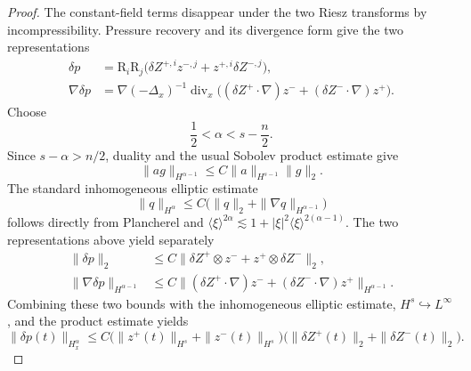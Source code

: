 \documentclass[11pt,reqno]{amsart}
\theoremstyle{plain}
\theoremstyle{definition}
\theoremstyle{remark}
\numberwithin{equation}{section}
\DeclareMathOperator{\Div}{div}
\newcommand{\Riesz}{\mathrm R}
\begin{document}
\begin{proof}
The constant-field terms disappear under the two Riesz transforms by
incompressibility.  Pressure recovery and its divergence form give the two
representations
\[
\begin{aligned}
 \delta p
 &=\Riesz_i\Riesz_j\bigl(
   \delta Z^{+,i}z^{-,j}+z^{+,i}\delta Z^{-,j}\bigr),\\
 \nabla\delta p
 &=\nabla(-\Delta_x)^{-1}\Div_x\bigl(
   (\delta Z^+\cdot\nabla)z^-
   +(\delta Z^-\cdot\nabla)z^+\bigr).
\end{aligned}
\]
Choose
\[
 \frac12<\alpha<s-\frac n2 .
\]
Since $s-\alpha>n/2$, duality and the usual Sobolev product estimate
give
\[
 \|ag\|_{H^{\alpha-1}}
 \le C\|a\|_{H^{s-1}}\|g\|_2.
\]
The standard inhomogeneous elliptic estimate
\[
 \|q\|_{H^\alpha}
 \le C\bigl(\|q\|_2+\|\nabla q\|_{H^{\alpha-1}}\bigr)
\]
follows directly from Plancherel and
$\langle\xi\rangle^{2\alpha}\lesssim
1+|\xi|^2\langle\xi\rangle^{2(\alpha-1)}$.  The two representations above
yield separately
\[
\begin{aligned}
 \|\delta p\|_2
 &\le C\|\delta Z^+\otimes z^-+z^+\otimes\delta Z^-\|_2,\\
 \|\nabla\delta p\|_{H^{\alpha-1}}
 &\le C\|(\delta Z^+\cdot\nabla)z^-
          +(\delta Z^-\cdot\nabla)z^+\|_{H^{\alpha-1}}.
\end{aligned}
\]
Combining these two bounds with the inhomogeneous elliptic estimate,
$H^s\hookrightarrow L^\infty$, and the product estimate yields
\[
 \|\delta p(t)\|_{H_x^\alpha}
 \le C\bigl(\|z^+(t)\|_{H^s}+\|z^-(t)\|_{H^s}\bigr)
 \bigl(\|\delta Z^+(t)\|_2+\|\delta Z^-(t)\|_2\bigr).
\]


\end{proof}
\end{document}
